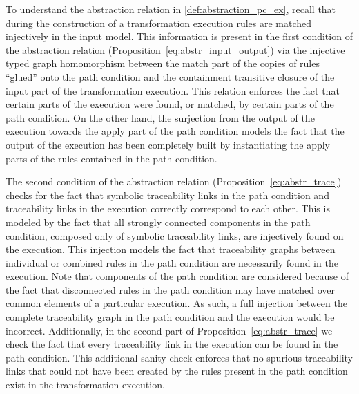 
To understand the abstraction relation in \cref{def:abstraction_pc_ex}, recall
that during the construction of a transformation execution rules are matched
injectively in the input model. This information is present in the first
condition of the abstraction relation (Proposition~\ref{eq:abstr_input_output})
via the injective typed graph homomorphism between the match part of the copies
of rules ``glued'' onto the path condition and the containment transitive
closure of the input part of the transformation execution. This relation
enforces the fact that certain parts of the execution were found, or matched, by
certain parts of the path condition.
On the other hand, the surjection from the output of the execution towards the
apply part of the path condition models the fact that the output of the
execution has been completely built by instantiating the apply parts of the
rules contained in the path condition.

The second condition of the abstraction relation
(Proposition~\ref{eq:abstr_trace}) checks for the fact that symbolic
traceability links in the path condition and traceability links in the execution
correctly correspond to each other. This is modeled by the fact that all
strongly connected components in the path condition, composed only of symbolic
traceability links, are injectively found on the execution. This injection
models the fact that traceability graphs between individual or combined rules in
the path condition are necessarily found in the execution. Note that components
of the path condition are considered because of the fact that disconnected rules
in the path condition may have matched over common elements of a particular
execution. As such, a full injection between the complete traceability graph in
the path condition and the execution would be incorrect. Additionally, in the
second part of Proposition~\ref{eq:abstr_trace} we check the fact that every
traceability link in the execution can be found in the path condition. This
additional sanity check enforces that no spurious traceability links that could
not have been created by the rules present in the path condition exist in the
transformation execution.

